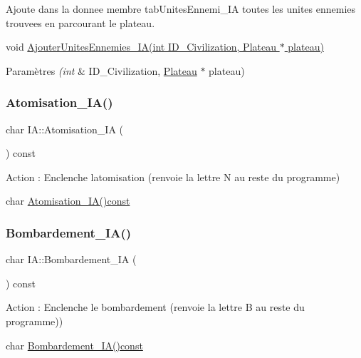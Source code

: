 Ajoute dans la donnee membre tab\+Unites\+Ennemi\+\_\+\+IA toutes les unites ennemies trouvees en parcourant le plateau. 

void \hyperlink{classIA_a7a6d457ddad0c9a14cc18dbe72c5eed8}{Ajouter\+Unites\+Ennemies\+\_\+\+I\+A(int I\+D\+\_\+\+Civilization, Plateau $\ast$ plateau)} 
\begin{DoxyParams}{Paramètres}
{\em (int} & I\+D\+\_\+\+Civilization, \hyperlink{classPlateau}{Plateau} $\ast$ plateau) \\
\hline
\end{DoxyParams}
\mbox{\label{classIA_a2af0d4f87cb7d94d31d401516ad9761d}} 
\subsubsection{\texorpdfstring{Atomisation\+\_\+\+I\+A()}{Atomisation\_IA()}}
{\footnotesize\ttfamily char I\+A\+::\+Atomisation\+\_\+\+IA (\begin{DoxyParamCaption}{ }\end{DoxyParamCaption}) const}



Action \+: Enclenche l\textquotesingle{}atomisation (renvoie la lettre N au reste du programme) 

char \hyperlink{classIA_a2af0d4f87cb7d94d31d401516ad9761d}{Atomisation\+\_\+\+I\+A()const} \mbox{\label{classIA_ac5712b300b84feed9fe00e04cd31cfbb}} 
\subsubsection{\texorpdfstring{Bombardement\+\_\+\+I\+A()}{Bombardement\_IA()}}
{\footnotesize\ttfamily char I\+A\+::\+Bombardement\+\_\+\+IA (\begin{DoxyParamCaption}{ }\end{DoxyParamCaption}) const}



Action \+: Enclenche le bombardement (renvoie la lettre B au reste du programme)) 

char \hyperlink{classIA_ac5712b300b84feed9fe00e04cd31cfbb}{Bombardement\+\_\+\+I\+A()const} \mbox{\label{classIA_a5b7bd62f9883f6959a636ca4bdd9b86a}} 
